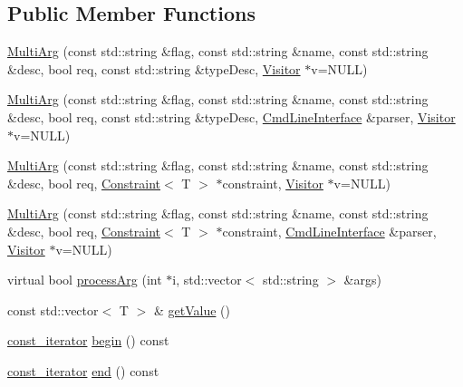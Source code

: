 \subsection*{Public Member Functions}
\begin{DoxyCompactItemize}
\item 
\hyperlink{class_t_c_l_a_p_1_1_multi_arg_a49b5437c7f06cd6864c07dc59814a953}{Multi\+Arg} (const std\+::string \&flag, const std\+::string \&name, const std\+::string \&desc, bool req, const std\+::string \&type\+Desc, \hyperlink{class_t_c_l_a_p_1_1_visitor}{Visitor} $\ast$v=N\+U\+L\+L)
\item 
\hyperlink{class_t_c_l_a_p_1_1_multi_arg_a48c90a873389280f72fb5d6ef707b400}{Multi\+Arg} (const std\+::string \&flag, const std\+::string \&name, const std\+::string \&desc, bool req, const std\+::string \&type\+Desc, \hyperlink{class_t_c_l_a_p_1_1_cmd_line_interface}{Cmd\+Line\+Interface} \&parser, \hyperlink{class_t_c_l_a_p_1_1_visitor}{Visitor} $\ast$v=N\+U\+L\+L)
\item 
\hyperlink{class_t_c_l_a_p_1_1_multi_arg_a38b1e32a8189356bd1e5ec7c2d43c1a3}{Multi\+Arg} (const std\+::string \&flag, const std\+::string \&name, const std\+::string \&desc, bool req, \hyperlink{class_t_c_l_a_p_1_1_constraint}{Constraint}$<$ T $>$ $\ast$constraint, \hyperlink{class_t_c_l_a_p_1_1_visitor}{Visitor} $\ast$v=N\+U\+L\+L)
\item 
\hyperlink{class_t_c_l_a_p_1_1_multi_arg_ad4fcd892de2f1ef275c30dc499215208}{Multi\+Arg} (const std\+::string \&flag, const std\+::string \&name, const std\+::string \&desc, bool req, \hyperlink{class_t_c_l_a_p_1_1_constraint}{Constraint}$<$ T $>$ $\ast$constraint, \hyperlink{class_t_c_l_a_p_1_1_cmd_line_interface}{Cmd\+Line\+Interface} \&parser, \hyperlink{class_t_c_l_a_p_1_1_visitor}{Visitor} $\ast$v=N\+U\+L\+L)
\item 
virtual bool \hyperlink{class_t_c_l_a_p_1_1_multi_arg_a344d3cf2128c510f92825e421ea667c7}{process\+Arg} (int $\ast$i, std\+::vector$<$ std\+::string $>$ \&args)
\item 
const std\+::vector$<$ T $>$ \& \hyperlink{class_t_c_l_a_p_1_1_multi_arg_aff4ff7f8d854dd668aaaf80511d8002b}{get\+Value} ()
\item 
\hyperlink{class_t_c_l_a_p_1_1_multi_arg_a3f8e9e8f5dcc7d3e6a518f42134cf64f}{const\+\_\+iterator} \hyperlink{class_t_c_l_a_p_1_1_multi_arg_a48058500cdc9ef8b9c2c9e6394ab499d}{begin} () const 
\item 
\hyperlink{class_t_c_l_a_p_1_1_multi_arg_a3f8e9e8f5dcc7d3e6a518f42134cf64f}{const\+\_\+iterator} \hyperlink{class_t_c_l_a_p_1_1_multi_arg_ac30e414b799158ff6710fb1e7ce83aee}{end} () const 

\end{DoxyCompactItemize}
